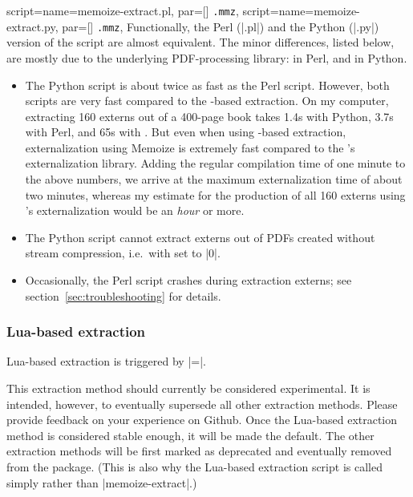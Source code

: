 \documentclass[a4paper,11pt]{article}
\begin{document}
\begin{doc}{
    script={name=memoize-extract.pl, par=[] \texttt{.mmz}},
    script={name=memoize-extract.py, par=[] \texttt{.mmz}},
  }
  Functionally, the Perl (|.pl|) and the Python (|.py|) version of the script
  are almost equivalent.  The minor differences, listed below, are mostly due
  to the underlying PDF-processing library:
   in Perl, and
   in Python.
  \begin{itemize}
  \item The Python script is about twice as fast as the Perl script.  However,
    both scripts are very fast compared to the -based extraction.
    On my computer, extracting 160 externs out of a 400-page book takes 1.4s
    with Python, 3.7s with Perl, and 65s with .  But even when
    using -based extraction, externalization using Memoize is
    extremely fast compared to the \TikZ's externalization library.  Adding
    the regular compilation time of one minute to the above numbers, we arrive
    at the maximum externalization time of about two minutes, whereas my
    estimate for the production of all 160 externs using \TikZ's
    externalization would be an \emph{hour} or more.
  \item The Python script cannot extract externs out of PDFs created without
    stream compression, i.e.\ with 
     set to |0|.
  \item Occasionally, the Perl script crashes during extraction externs; see
    section~\ref{sec:troubleshooting} for details.
  \end{itemize}
\end{doc}

\subsubsection{Lua-based extraction}
\label{sec:ref:extraction-lua}

Lua-based extraction is triggered by |=|.

This extraction method should currently be considered experimental.  It is
intended, however, to eventually supersede all other extraction methods.
Please provide feedback on your experience on Github. %
Once the Lua-based extraction method is considered stable enough, it will be
made the default.  The other extraction methods will be first marked as
deprecated and eventually removed from the package.  (This is also why the
Lua-based extraction script is called simply  rather
than |memoize-extract|.)
\end{document}
